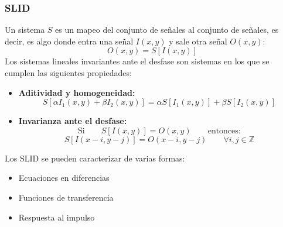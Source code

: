 \begin{frame}\frametitle{SLID}
  Un sistema $S$ es un mapeo del conjunto de señales al conjunto de señales, es decir, es algo donde entra una señal $I(x,y)$ y sale otra señal $O(x,y)$:
  \[O(x,y) = S[I(x,y)]\]
  Los sistemas lineales invariantes ante el desfase son sistemas en los que se cumplen las siguientes propiedades:
  \begin{itemize}
  \item \textbf{Aditividad y homogeneidad:}
    \[S[\alpha I_1(x,y) + \beta I_2(x,y)] = \alpha S[I_1(x,y)] + \beta S[I_2(x,y)]\]
  \item \textbf{Invarianza ante el desfase:}
    \[\textrm{Si} \qquad S[I(x,y)] = O(x,y) \qquad\textrm{entonces:}\]
    \[S[I(x-i, y-j)] = O(x-i, y-j) \qquad \forall i,j \in \mathbb{Z}\]
  \end{itemize}
  Los SLID se pueden caracterizar de varias formas:
  \begin{itemize}
  \item Ecuaciones en diferencias
  \item Funciones de transferencia
  \item Respuesta al impulso
  \end{itemize}
\end{frame}

